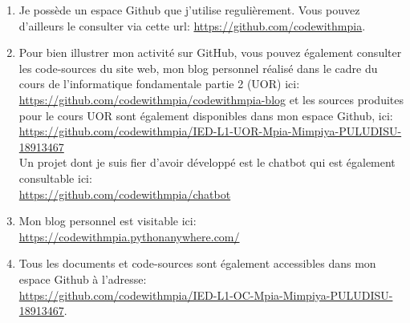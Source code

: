 \documentclass[a4paper,11pt]{article}
\begin{document}
            \bigskip
            \begin{enumerate}
                \item Je possède un espace Github que j'utilise regulièrement. Vous pouvez d'ailleurs
                le consulter via cette url: \url{https://github.com/codewithmpia}.

                \item Pour bien illustrer mon activité sur GitHub, vous pouvez également consulter les code-sources du site web, mon 
                blog personnel réalisé dans le cadre du cours de l'informatique fondamentale partie 2 (UOR) ici:\\
                \url{https://github.com/codewithmpia/codewithmpia-blog} et les sources produites pour le cours UOR sont également disponibles dans mon espace Github, ici:\\
                \url{https://github.com/codewithmpia/IED-L1-UOR-Mpia-Mimpiya-PULUDISU-18913467} \\ Un projet dont je suis fier d'avoir développé est le chatbot qui est également consultable ici:\\
                \url{https://github.com/codewithmpia/chatbot}

                \item Mon blog personnel est visitable ici: \url{https://codewithmpia.pythonanywhere.com/}
                \item Tous les documents et code-sources sont également accessibles dans mon espace Github à l'adresse:\\
                \url{https://github.com/codewithmpia/IED-L1-OC-Mpia-Mimpiya-PULUDISU-18913467}.
            \end{enumerate}
            
\end{document}
